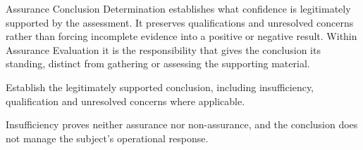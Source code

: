 Assurance Conclusion Determination establishes what confidence is legitimately supported by the assessment. It preserves qualifications and unresolved concerns rather than forcing incomplete evidence into a positive or negative result. Within Assurance Evaluation it is the responsibility that gives the conclusion its standing, distinct from gathering or assessing the supporting material.



Establish the legitimately supported conclusion, including insufficiency, qualification and unresolved concerns where applicable.



Insufficiency proves neither assurance nor non-assurance, and the conclusion does not manage the subject's operational response.
